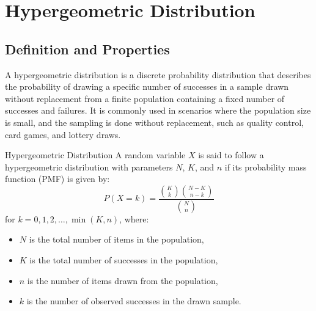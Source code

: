 \documentclass[openany]{book}
\begin{document}
\section{Hypergeometric Distribution}
\subsection{Definition and Properties}
A hypergeometric distribution is a discrete probability distribution that describes the probability of drawing a specific number of successes in a sample drawn without replacement from a finite population containing a fixed number of successes and failures. It is commonly used in scenarios where the population size is small, and the sampling is done without replacement, such as quality control, card games, and lottery draws.
\begin{mydefinition}{Hypergeometric Distribution}
    A random variable $X$ is said to follow a hypergeometric distribution with parameters $N$, $K$, and $n$ if its probability mass function (PMF) is given by:
    $$P(X = k) = \frac{\binom{K}{k} \binom{N-K}{n-k}}{\binom{N}{n}}$$
    for $k = 0, 1, 2, \ldots, \min(K, n)$, where:
    \begin{itemize}
        \item $N$ is the total number of items in the population,
        \item $K$ is the total number of successes in the population,
        \item $n$ is the number of items drawn from the population,
        \item $k$ is the number of observed successes in the drawn sample.
    \end{itemize}
\end{mydefinition}
\end{document}
